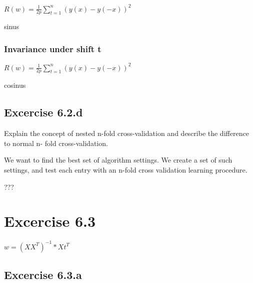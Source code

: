 \documentclass[a4paper,headings=small]{scrartcl}
\numberwithin{equation}{section} %
\numberwithin{figure}{section}   %
\begin{document}
$R(w) = \frac{1}{2p} \sum_{t=1}^n (y(x) - y(-x))^2$

sinus


\subsubsection{Invariance under shift t}

$R(w) = \frac{1}{2p} \sum_{t=1}^n (y(x) - y(-x))^2$

cosinus


\subsection{Excercise 6.2.d}

Explain the concept of nested n-fold cross-validation and describe the difference to normal n-
fold cross-validation.

We want to find the best set of algorithm settings.
We create a set of such settings, and test each entry with an n-fold cross
validation learning procedure.

???


\section{Excercise 6.3}

$w = (XX^T)^{-1} * Xt^T$

\subsection{Excercise 6.3.a}
\end{document}
